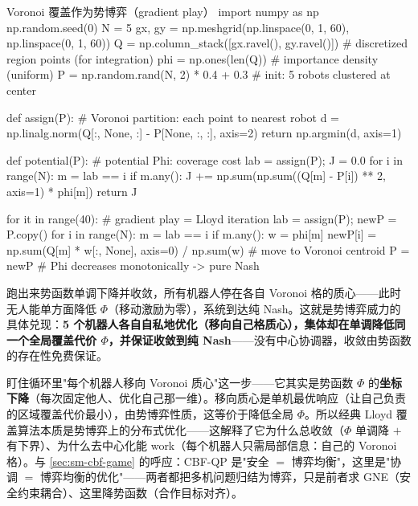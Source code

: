 \begin{codebox}[Python]{Voronoi 覆盖作为势博弈（gradient play）}
import numpy as np
np.random.seed(0)
N = 5
gx, gy = np.meshgrid(np.linspace(0, 1, 60), np.linspace(0, 1, 60))
Q = np.column_stack([gx.ravel(), gy.ravel()])    # discretized region points (for integration)
phi = np.ones(len(Q))                            # importance density (uniform)
P = np.random.rand(N, 2) * 0.4 + 0.3             # init: 5 robots clustered at center

def assign(P):                                   # Voronoi partition: each point to nearest robot
    d = np.linalg.norm(Q[:, None, :] - P[None, :, :], axis=2)
    return np.argmin(d, axis=1)

def potential(P):                                # potential Phi: coverage cost
    lab = assign(P); J = 0.0
    for i in range(N):
        m = lab == i
        if m.any():
            J += np.sum(np.sum((Q[m] - P[i]) ** 2, axis=1) * phi[m])
    return J

for it in range(40):                             # gradient play = Lloyd iteration
    lab = assign(P); newP = P.copy()
    for i in range(N):
        m = lab == i
        if m.any():
            w = phi[m]
            newP[i] = np.sum(Q[m] * w[:, None], axis=0) / np.sum(w)   # move to Voronoi centroid
    P = newP                                     # Phi decreases monotonically -> pure Nash
\end{codebox}

跑出来势函数单调下降并收敛，所有机器人停在各自 Voronoi 格的质心——此时无人能单方面降低 $\Phi$（移动激励为零），系统到达纯 Nash。这就是势博弈威力的具体兑现：\textbf{5 个机器人各自自私地优化（移向自己格质心），集体却在单调降低同一个全局覆盖代价 $\Phi$，并保证收敛到纯 Nash}——没有中心协调器，收敛由势函数的存在性免费保证。

\begin{insight}[Lloyd 算法 $=$ 势函数的坐标下降]
盯住循环里"每个机器人移向 Voronoi 质心"这一步——它其实是势函数 $\Phi$ 的\textbf{坐标下降}（每次固定他人、优化自己那一维）。移向质心是单机最优响应（让自己负责的区域覆盖代价最小），由势博弈性质，这等价于降低全局 $\Phi$。所以经典 Lloyd 覆盖算法本质是势博弈上的分布式优化——这解释了它为什么总收敛（$\Phi$ 单调降 $+$ 有下界）、为什么去中心化能 work（每个机器人只需局部信息：自己的 Voronoi 格）。与 \cref{sec:sm-cbf-game} 的呼应：CBF-QP 是"安全 $=$ 博弈均衡"，这里是"协调 $=$ 博弈均衡的优化"——两者都把多机问题归结为博弈，只是前者求 GNE（安全约束耦合）、这里降势函数（合作目标对齐）。
\end{insight}

